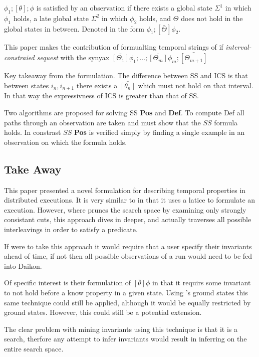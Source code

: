 $\phi_1;[\theta];\phi$ is satisfied by an observation if there exists a global
state $\Sigma^1$ in which $\phi_1$ holds, a late global state $\Sigma^2$ in
which $\phi_2$ holds, and $\Theta$ does not hold in the global states in
between. Denoted in the form $\phi_1;[\bar{\Theta}]\phi_2$.

This paper makes the contribution of formualting temporal strings of if
\textit{interval-constraied sequest} with the synyax
$\bar{[\Theta_1]}\phi_1;\dots;\bar{[\Theta_m]}\phi_m;\bar{[\Theta_{m+1}]}$

Key takeaway from the formulation. The difference between SS and ICS is that
between states $i_n,i_{n+1}$ there exists a $\bar{[\theta_n]}$ which must not
hold on that interval. In that way the expressivness of ICS is greater than
that of SS.

Two algorithms are proposed for solving SS \textbf{Pos} and \textbf{Def}. To
compute Def all paths through an observation are taken and must show that the
$SS$ formula holds. In constrast $SS$ \textbf{Pos} is verified simply by
finding a single example in an observation on which the formula holds.

\subsection{Take Away}

This paper presented a novel formulation for describing temporal properties in
distributed executions. It is very similar to \dinv in that it uses a latice to
formulate an execution. However, where \dinv prunes the search space by
examining only strongly consistant cuts, this approach dives in deeper, and
actually traverses all possible interleavings in order to satisfy a predicate.

If \dinv were to take this approach it would require that a user specify their
invariants ahead of time, if not then all possible observations of a run would
need to be fed into Daikon.

Of specific interest is their formulation of $\bar{[\theta]}\phi$ in that it
requirs some invariant to not hold before a know property in a given state.
Using \dinv's ground states this same technique could still be applied,
although it would be equally restricted by ground states. However, this could
still be a potential extension.

The clear problem with mining invariants using this technique is that it is a
search, therfore any attempt to infer invariants would result in inferring on
the entire search space.

